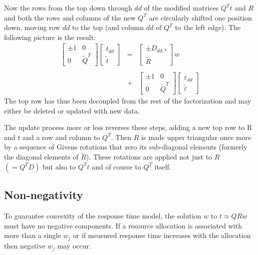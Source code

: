 Now the rows from the top down through $dd$ of the modified matrices $Q^Tt$ and $R$ and both the rows and columns of the new $Q^T$
are circularly shifted one position down, moving row $dd$ to the top (and column $dd$ of $Q^T$ to the left edge).
The following picture is the result:
\begin{displaymath}
\begin{array}{lll}
    \left[\begin{array}{cc}
      \pm1  &  0 \\
      0     &  \tilde{Q}^T
   \end{array}\right]
   \left[\begin{array}{c}
      t_{dd} \\
      \tilde{t}
   \end{array}\right]
   &=&
   \left[\begin{array}{c}
      \pm D_{dd,*} \\
      \tilde{R}
   \end{array}\right] w
   \\
   \\
   &+&
   \left[\begin{array}{cc}
      \pm1  &  0 \\
      0     &  \tilde{Q}^T
   \end{array}\right]
   \left[\begin{array}{c}
      \varepsilon_{dd} \\
      \tilde{\varepsilon}
   \end{array}\right]
\end{array}
\end{displaymath}
The top row has thus been decoupled from the rest of the factorization and may either be deleted or updated with new data.

The update process more or less reverses these steps, adding a new top row to R and $t$ and a row and column to $Q^T$.
Then $R$ is made upper triangular once more by a sequence of Givens rotations that zero its sub-diagonal elements
(formerly the diagonal elements of $\tilde{R}$).
These rotations are applied not just to $R$ $(= Q^T D)$ but also to $Q^Tt$ and of course to $Q^T$ itself.

\subsection*{Non-negativity}

To guarantee convexity of the response time model, the solution $w$ to $t \approx QRw$ must have no negative components.
If a resource allocation is associated with more than a single $w_j$
or if measured response time increases with the allocation
then negative $w_j$ may occur.

